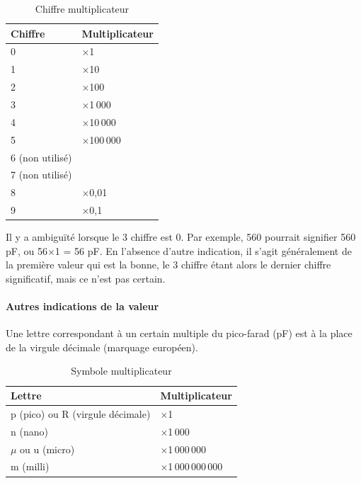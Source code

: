 \documentclass[a4paper]{article}
\begin{document}
\begin{table}[H]
	\centering
		\begin{tabular}{|l|l|}\hline
				Chiffre & Multiplicateur\\\hline\hline
				0 & $\times$1\\\hline
				1 & $\times$10\\\hline
				2 & $\times$100\\\hline
				3 & $\times$1\,000\\\hline
				4 & $\times$10\,000\\\hline
				5 & $\times$100\,000\\\hline
				6 (non utilisé) & \\\hline
				7 (non utilisé) & \\\hline
				8 & $\times$0,01\\\hline
				9 & $\times$0,1\\\hline
		\end{tabular}
	\caption{Chiffre multiplicateur
		\label{Chiffre_multiplicateur}}
\end{table}

Il y a ambiguïté lorsque le 3\ieme{} chiffre est 0. Par exemple, \og{}560\fg{} pourrait signifier 560 pF, ou 56$\times$1 = 56 pF. En l'absence d'autre indication, il s'agit généralement de la première valeur qui est la bonne, le 3\ieme{} chiffre étant alors le dernier chiffre significatif, mais ce n'est pas certain.

\paragraph{Autres indications de la valeur}

Une lettre correspondant à un certain multiple du pico-farad (pF) est à la place de la virgule décimale (marquage européen).

\begin{table}[H]
	\centering
		\begin{tabular}{|l|l|}\hline
				Lettre & Multiplicateur\\\hline\hline
				p (pico) ou R (virgule décimale) & $\times$1\\\hline
				n (nano) & $\times$1\,000\\\hline
				$\mu$ ou u (micro) & $\times$1\,000\,000\\\hline
				m (milli) & $\times$1\,000\,000\,000\\\hline
		\end{tabular}
	\caption{Symbole multiplicateur
		\label{Symbole_multiplicateur}}
\end{table}
\end{document}
